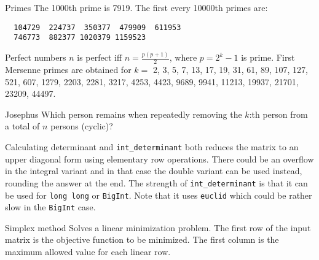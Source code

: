 \categorycontents{}




\begin{algorithm}{Primes}
\desc
The 1000th prime is 7919. The first every 10000th primes are:
{\small
\begin{verbatim}
  104729  224737  350377  479909  611953
  746773  882377 1020379 1159523
\end{verbatim}
}\end{algorithm}




\begin{algorithm}{Perfect numbers}
\desc
$n$ is perfect iff $n = \frac{p(p+1)}{2}$, where $p = 2^k-1$ is prime.
First Mersenne primes are obtained for $k =$ 2, 3, 5, 7, 13, 17, 19,
31, 61, 89, 107, 127, 521, 607, 1279, 2203, 2281, 3217, 4253, 4423,
9689, 9941, 11213, 19937, 21701, 23209, 44497.
\end{algorithm}

\begin{algorithm}{Josephus}
\desc
Which person remains when repeatedly removing the $k$:th person from a
total of $n$ persons (cyclic)?
\end{algorithm}



\begin{algorithm}{Calculating determinant}
 and {\tt int\_determinant} both reduces the matrix
to an upper diagonal form using elementary row operations. There could be an
overflow in the integral variant and in that case the double variant
can be used instead, rounding the answer at the end. The strength of
{\tt int\_determinant} is that it can be used for {\tt long long} or
{\tt BigInt}. Note that it uses {\tt euclid} which could be rather
slow in the {\tt BigInt} case.
\end{algorithm}

\begin{algorithm}{Simplex method}
\desc
Solves a linear minimization problem. The first row of the
input matrix is the objective function to be minimized. The
first column is the maximum allowed value for each linear row.
\end{algorithm}




